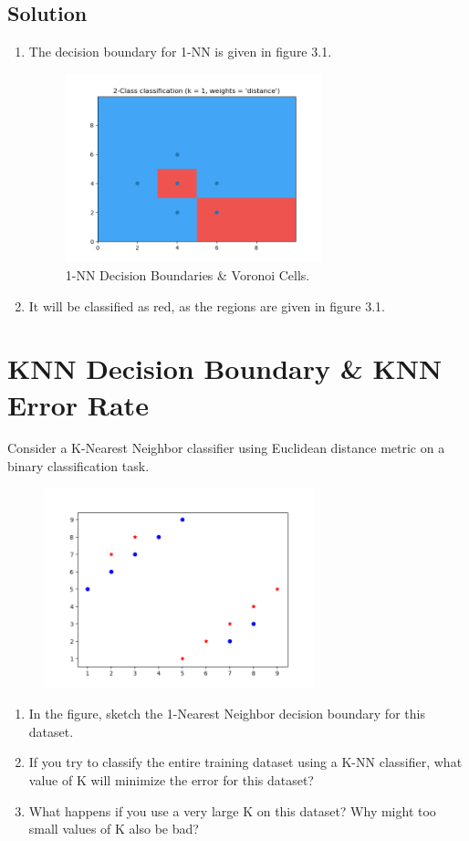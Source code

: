 \documentclass[12pt]{article}
\numberwithin{equation}{section}
\numberwithin{table}{section}
\numberwithin{figure}{section}
\begin{document}
\subsection*{Solution}
\begin{enumerate}[label=(\alph*)]
	\item The decision boundary for 1-NN is given in figure 3.1.
	
	\begin{figure}[!h]\centering
		\includegraphics[width=0.7\textwidth]{3_2.png}
		\caption{1-NN Decision Boundaries \& Voronoi Cells.}
		\label{pl1}
	\end{figure}

	\item It will be classified as red, as the regions are given in figure 3.1.
\end{enumerate}

\section{KNN Decision Boundary \& KNN Error Rate}
Consider a K-Nearest Neighbor classifier using Euclidean distance metric on a binary classification task.
	\begin{figure}[!h]\centering
	\includegraphics[width=0.7\textwidth]{4.png}
	\label{pl1}
\end{figure}
\begin{enumerate}[label=(\alph*)]
	\item In the figure, sketch the 1-Nearest Neighbor decision boundary for this dataset.
	\item If you try to classify the entire training dataset using a K-NN classifier, what value of K will minimize the error for this dataset?
	\item What happens if you use a very large K on this dataset? Why might too small values of K also be bad?
\end{enumerate}
\newpage
\end{document}
